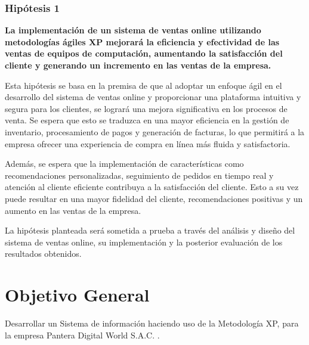 \documentclass[12pt,a4paper]{article}
\newcommand{\espacio}{\par\vspace{3mm}}
\newcommand{\newsection}[1]{\section{\hspace{6mm} #1}}%
\newcommand{\empresa}{Pantera Digital World S.A.C. }
\begin{document}
\subsubsection*{Hipótesis 1} 
\textbf{La implementación de un sistema de ventas online utilizando metodologías ágiles XP mejorará la eficiencia y efectividad de las ventas de equipos de computación, aumentando la satisfacción del cliente y generando un incremento en las ventas de la empresa.}
\espacio
Esta hipótesis se basa en la premisa de que al adoptar un enfoque ágil en el desarrollo del sistema de ventas online y proporcionar una plataforma intuitiva y segura para los clientes, se logrará una mejora significativa en los procesos de venta. Se espera que esto se traduzca en una mayor eficiencia en la gestión de inventario, procesamiento de pagos y generación de facturas, lo que permitirá a la empresa ofrecer una experiencia de compra en línea más fluida y satisfactoria.
\espacio
Además, se espera que la implementación de características como recomendaciones personalizadas, seguimiento de pedidos en tiempo real y atención al cliente eficiente contribuya a la satisfacción del cliente. Esto a su vez puede resultar en una mayor fidelidad del cliente, recomendaciones positivas y un aumento en las ventas de la empresa.
\espacio
La hipótesis planteada será sometida a prueba a través del análisis y diseño del sistema de ventas online, su implementación y la posterior evaluación de los resultados obtenidos.



\newpage
\newsection{Objetivo General}
Desarrollar un Sistema de información haciendo uso de la Metodología XP, para la empresa \empresa.
\end{document}
